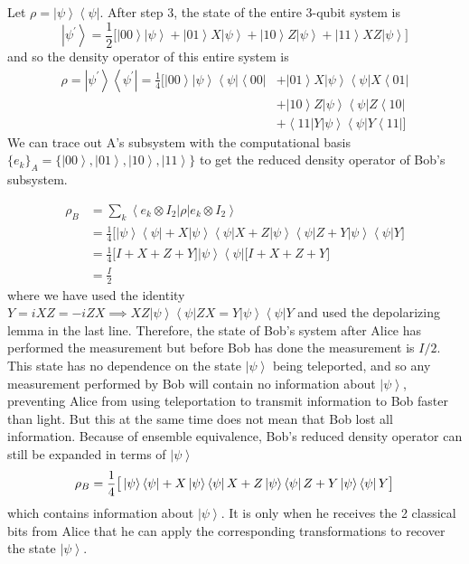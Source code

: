 \documentclass{article}
\newcommand{\ket}[1]{\ensuremath{\left|#1\right\rangle}}
\newcommand{\bra}[1]{\ensuremath{\left\langle#1\right|}}
\begin{document}
    Let $\rho = \ket{\psi} \bra{\psi}$. After step 3, the state of the entire 3-qubit system is 
    \begin{equation}
      \ket{\psi^\prime} = \frac{1}{2} \big[ \ket{00} \ket{\psi} + \ket{01} X \ket{\psi} + \ket{10} Z \ket{\psi} + \ket{11} X Z \ket{\psi} \big]
    \end{equation}
    and so the density operator of this entire system is  
    \begin{align}
      \rho = \ket{\psi^\prime} \bra{\psi^\prime} = \frac{1}{4} \Big[ \ket{00} \ket{\psi} \bra{\psi} \bra{00} & + \ket{01} X \ket{\psi} \bra{\psi} X \bra{01} \\ 
      & + \ket{10} Z \ket{\psi} \bra{\psi} Z \bra{10} \\ 
      & + \bra{11} Y \ket{\psi} \bra{\psi} Y \bra{11} \big] 
    \end{align}
    We can trace out A's subsystem with the computational basis $\{e_k\}_A = \{\ket{00} , \ket{01}, \ket{10}, \ket{11}\}$ to get the reduced density operator of Bob's subsystem. 

    \begin{align}
      \rho_B & = \sum_k \bra{e_k \otimes I_2 } \rho \ket{e_k \otimes I_2} \\
             & = \frac{1}{4} \big[ \ket{\psi} \bra{\psi} + X \ket{\psi} \bra{\psi} X  + Z \ket{\psi} \bra{\psi} Z + Y \ket{\psi} \bra{\psi} Y \big] \\
             & = \frac{1}{4} \big[ I + X + Z + Y \big] \ket{\psi} \bra{\psi} \big[ I + X + Z + Y \big] \\ 
             & = \frac{I}{2}
    \end{align}
    where we have used the identity $Y = iXZ = -iZX \implies XZ \ket{\psi} \bra{\psi} Z X = Y \ket{\psi} \bra{\psi} Y$ and used the depolarizing lemma in the last line. Therefore, the state of Bob's system after Alice has performed the measurement but before Bob has done the measurement is $I/2$. This state has no dependence on the state $\ket{\psi}$ being teleported, and so any measurement performed by Bob will contain no information about $\ket{\psi}$, preventing Alice from using teleportation to transmit information to Bob faster than light. But this at the same time does not mean that Bob lost all information. Because of ensemble equivalence, Bob's reduced density operator can still be expanded in terms of $\ket{\psi}$ 
    \begin{equation}
      \rho_B = \frac{1}{4} \big[ \ket{\psi} \bra{\psi} + X \ket{\psi} \bra{\psi} X  + Z \ket{\psi} \bra{\psi} Z + Y \ket{\psi} \bra{\psi} Y \big] \\
    \end{equation}
    which contains information about $\ket{\psi}$. It is only when he receives the 2 classical bits from Alice that he can apply the corresponding transformations to recover the state $\ket{\psi}$. 
\end{document}
